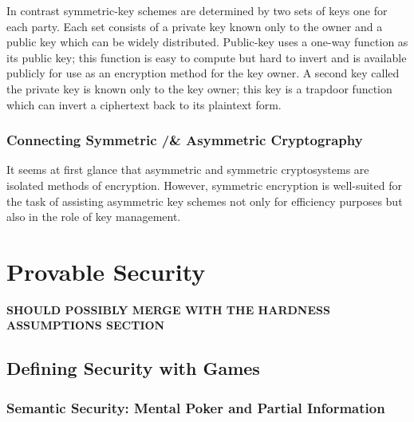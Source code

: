 In contrast symmetric-key schemes are determined by two sets of keys one for each party. Each set consists of a private key known only to the owner and a public key which can be widely distributed.
Public-key uses a one-way function as its public key; this function is easy to compute but hard to invert and is available publicly for use as an encryption method for the key owner. A second key called the private key is known only to the key owner; this key is a trapdoor function which can invert a ciphertext back to its plaintext form.
 
\subsubsection{Connecting Symmetric /& Asymmetric Cryptography}
It seems at first glance that asymmetric and symmetric cryptosystems are isolated methods of encryption. However, symmetric encryption is well-suited for the task of assisting asymmetric key schemes not only for efficiency purposes but also in the role of key management. 

\section{Provable Security} 

\textbf{SHOULD POSSIBLY MERGE WITH THE HARDNESS ASSUMPTIONS SECTION} 

\subsection{Defining Security with Games} 

\subsubsection{Semantic Security: Mental Poker and Partial Information} 

